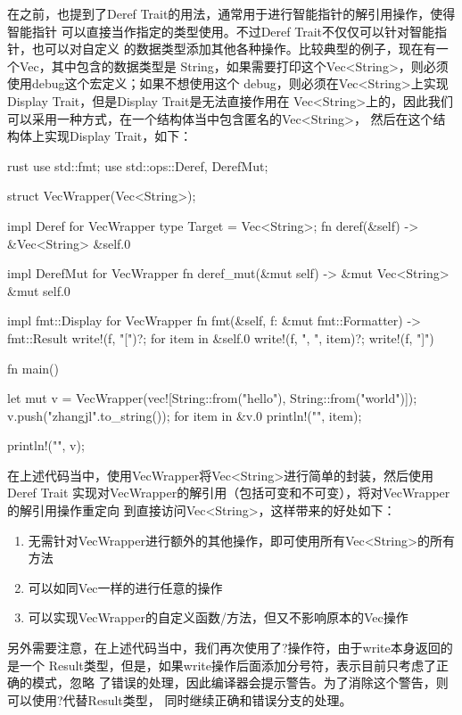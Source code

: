 在之前，也提到了Deref Trait的用法，通常用于进行智能指针的解引用操作，使得智能指针
可以直接当作指定的类型使用。不过Deref Trait不仅仅可以针对智能指针，也可以对自定义
的数据类型添加其他各种操作。比较典型的例子，现在有一个Vec，其中包含的数据类型是
String，如果需要打印这个Vec<String>，则必须使用debug这个宏定义；如果不想使用这个
debug，则必须在Vec<String>上实现Display Trait，但是Display Trait是无法直接作用在
Vec<String>上的，因此我们可以采用一种方式，在一个结构体当中包含匿名的Vec<String>，
然后在这个结构体上实现Display Trait，如下：
\begin{code-block}{rust}
use std::fmt;
use std::ops::{Deref, DerefMut};

struct VecWrapper(Vec<String>);

impl Deref for VecWrapper {
    type Target = Vec<String>;
    fn deref(&self) -> &Vec<String> {
        &self.0
    }
}

impl DerefMut for VecWrapper {
    fn deref_mut(&mut self) -> &mut Vec<String> {
        &mut self.0
    }
}

impl fmt::Display for VecWrapper {
    fn fmt(&self, f: &mut fmt::Formatter) -> fmt::Result {
        write!(f, "[")?;
        for item in &self.0 {
            write!(f, "{}, ", item)?;
        }
        write!(f, "]")
    }
}

fn main() {
    let mut v = VecWrapper(vec![String::from("hello"), String::from("world")]);
    v.push("zhangjl".to_string());
    for item in &v.0 {
        println!("{}", item);
    }

    println!("{}", v);
}
\end{code-block}
在上述代码当中，使用VecWrapper将Vec<String>进行简单的封装，然后使用Deref Trait
实现对VecWrapper的解引用（包括可变和不可变），将对VecWrapper的解引用操作重定向
到直接访问Vec<String>，这样带来的好处如下：
\begin{enumerate}
  \item 无需针对VecWrapper进行额外的其他操作，即可使用所有Vec<String>的所有方法
  \item 可以如同Vec一样的进行任意的操作
  \item 可以实现VecWrapper的自定义函数/方法，但又不影响原本的Vec操作
\end{enumerate}

另外需要注意，在上述代码当中，我们再次使用了?操作符，由于write本身返回的是一个
Result类型，但是，如果write操作后面添加分号符，表示目前只考虑了正确的模式，忽略
了错误的处理，因此编译器会提示警告。为了消除这个警告，则可以使用?代替Result类型，
同时继续正确和错误分支的处理。

